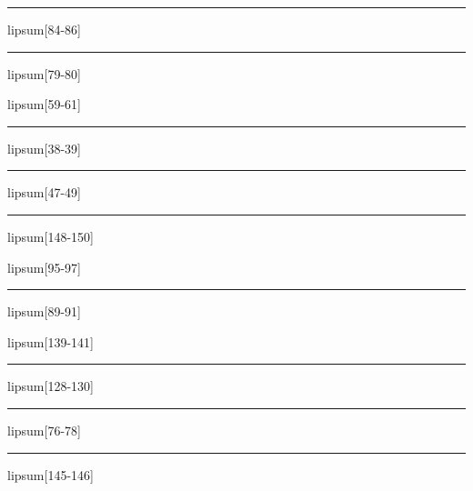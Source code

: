 \documentclass[11pt,a4paper]{article}
\begin{document}
\begin{simplewrap}
  \textcolor{magenta!43}{\rule{4.9cm}{5.3cm}}
\end{simplewrap}
lipsum[84-86]

\begin{simplewrap}
  \textcolor{cyan!45}{\rule{4.3cm}{4.4cm}}
\end{simplewrap}
lipsum[79-80]

lipsum[59-61]

\begin{simplewrap}
  \textcolor{red!33}{\rule{5.9cm}{8.2cm}}
\end{simplewrap}
lipsum[38-39]

\begin{simplewrap}
  \textcolor{blue!20}{\rule{4.9cm}{3.3cm}}
\end{simplewrap}
lipsum[47-49]

\begin{simplewrap}
  \textcolor{purple!20}{\rule{3.7cm}{2.3cm}}
\end{simplewrap}
lipsum[148-150]

lipsum[95-97]

\begin{simplewrap}
  \textcolor{cyan!23}{\rule{4.7cm}{2.3cm}}
\end{simplewrap}
lipsum[89-91]

lipsum[139-141]

\begin{simplewrap}
  \textcolor{cyan!44}{\rule{3.9cm}{9.4cm}}
\end{simplewrap}
lipsum[128-130]

\begin{simplewrap}
  \textcolor{blue!30}{\rule{3.5cm}{9.8cm}}
\end{simplewrap}
lipsum[76-78]

\begin{simplewrap}
  \textcolor{violet!58}{\rule{5.9cm}{6.6cm}}
\end{simplewrap}
lipsum[145-146]
\end{document}
